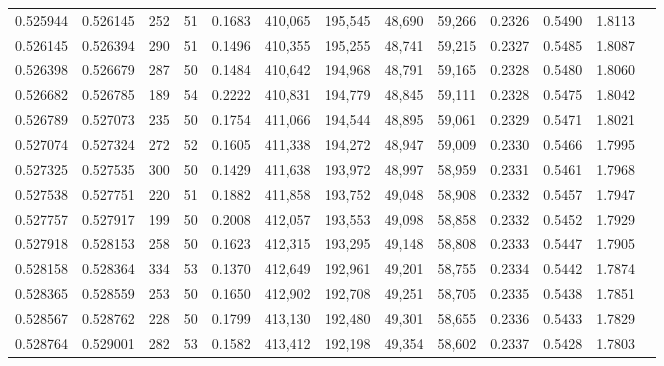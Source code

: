 \begin{tabular}{rrrrrrrrrrrrr}
0.525944 & 0.526145 &   252 &  51 &                                     0.1683 & 410,065 & 195,545 &  48,690 &  59,266 & 0.2326 & 0.5490 & 1.8113 \\
0.526145 & 0.526394 &   290 &  51 &                                     0.1496 & 410,355 & 195,255 &  48,741 &  59,215 & 0.2327 & 0.5485 & 1.8087 \\
0.526398 & 0.526679 &   287 &  50 &                                     0.1484 & 410,642 & 194,968 &  48,791 &  59,165 & 0.2328 & 0.5480 & 1.8060 \\
0.526682 & 0.526785 &   189 &  54 &                                     0.2222 & 410,831 & 194,779 &  48,845 &  59,111 & 0.2328 & 0.5475 & 1.8042 \\
0.526789 & 0.527073 &   235 &  50 &                                     0.1754 & 411,066 & 194,544 &  48,895 &  59,061 & 0.2329 & 0.5471 & 1.8021 \\
0.527074 & 0.527324 &   272 &  52 &                                     0.1605 & 411,338 & 194,272 &  48,947 &  59,009 & 0.2330 & 0.5466 & 1.7995 \\
0.527325 & 0.527535 &   300 &  50 &                                     0.1429 & 411,638 & 193,972 &  48,997 &  58,959 & 0.2331 & 0.5461 & 1.7968 \\
0.527538 & 0.527751 &   220 &  51 &                                     0.1882 & 411,858 & 193,752 &  49,048 &  58,908 & 0.2332 & 0.5457 & 1.7947 \\
0.527757 & 0.527917 &   199 &  50 &                                     0.2008 & 412,057 & 193,553 &  49,098 &  58,858 & 0.2332 & 0.5452 & 1.7929 \\
0.527918 & 0.528153 &   258 &  50 &                                     0.1623 & 412,315 & 193,295 &  49,148 &  58,808 & 0.2333 & 0.5447 & 1.7905 \\
0.528158 & 0.528364 &   334 &  53 &                                     0.1370 & 412,649 & 192,961 &  49,201 &  58,755 & 0.2334 & 0.5442 & 1.7874 \\
0.528365 & 0.528559 &   253 &  50 &                                     0.1650 & 412,902 & 192,708 &  49,251 &  58,705 & 0.2335 & 0.5438 & 1.7851 \\
0.528567 & 0.528762 &   228 &  50 &                                     0.1799 & 413,130 & 192,480 &  49,301 &  58,655 & 0.2336 & 0.5433 & 1.7829 \\
0.528764 & 0.529001 &   282 &  53 &                                     0.1582 & 413,412 & 192,198 &  49,354 &  58,602 & 0.2337 & 0.5428 & 1.7803 \\

\end{tabular}
